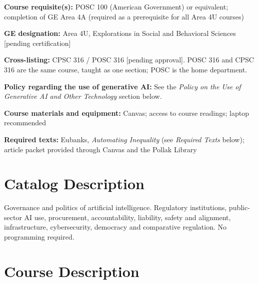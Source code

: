 \documentclass[12pt]{article}
\begin{document}
\vspace{0.5em}
\begin{flatlist}
\item \textbf{Course requisite(s):} POSC 100 (American Government) or equivalent; completion of GE Area 4A (required as a prerequisite for all Area 4U courses)
\item \textbf{GE designation:} Area 4U, Explorations in Social and Behavioral Sciences [pending certification]
\item \textbf{Cross-listing:} CPSC 316 / POSC 316 [pending approval]. POSC 316 and CPSC 316 are the same course, taught as one section; POSC is the home department.
\item \textbf{Policy regarding the use of generative AI:} See the \emph{Policy on the Use of Generative AI and Other Technology} section below.
\item \textbf{Course materials and equipment:} Canvas; access to course readings; laptop recommended
\item \textbf{Required texts:} Eubanks, \emph{Automating Inequality} (see \emph{Required Texts} below); article packet provided through Canvas and the Pollak Library
\end{flatlist}

\section*{Catalog Description}
Governance and politics of artificial intelligence. Regulatory institutions, public-sector AI use, procurement, accountability, liability, safety and alignment, infrastructure, cybersecurity, democracy and comparative regulation. No programming required.

\section*{Course Description}
\end{document}

